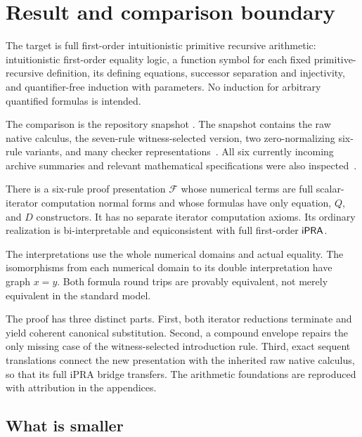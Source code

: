 \section{Result and comparison boundary}
\label{sec:result}

The target is full first-order intuitionistic primitive recursive arithmetic:
intuitionistic first-order equality logic, a function symbol for each fixed
primitive-recursive definition, its defining equations, successor separation
and injectivity, and quantifier-free induction with parameters. No induction
for arbitrary quantified formulas is intended.

The comparison is the repository snapshot
.
The snapshot contains the raw native calculus, the seven-rule
witness-selected version, two zero-normalizing six-rule variants, and
many checker representations~\cite{snapshot,native,canonical,zero}.
All six currently incoming archive summaries and relevant mathematical
specifications were also inspected~\cite{incoming}.

\begin{theorem}
There is a six-rule proof presentation $\mathcal F$ whose numerical terms
are full scalar-iterator computation normal forms and whose formulas have
only equation, $Q$, and $D$ constructors. It has no separate iterator
computation axioms. Its ordinary realization is bi-interpretable and
equiconsistent with full first-order $\mathsf{iPRA}$.

The interpretations use the whole numerical domains and actual equality.
The isomorphisms from each numerical domain to its double interpretation
have graph $x=y$. Both formula round trips are provably equivalent, not
merely equivalent in the standard model.
\end{theorem}

The proof has three distinct parts. First, both iterator reductions
terminate and yield coherent canonical substitution. Second, a compound
envelope repairs the only missing case of the witness-selected introduction
rule. Third, exact sequent translations connect the new presentation with
the inherited raw native calculus, so that its full iPRA bridge transfers.
The arithmetic foundations are reproduced with attribution in the appendices.

\subsection{What is smaller}

